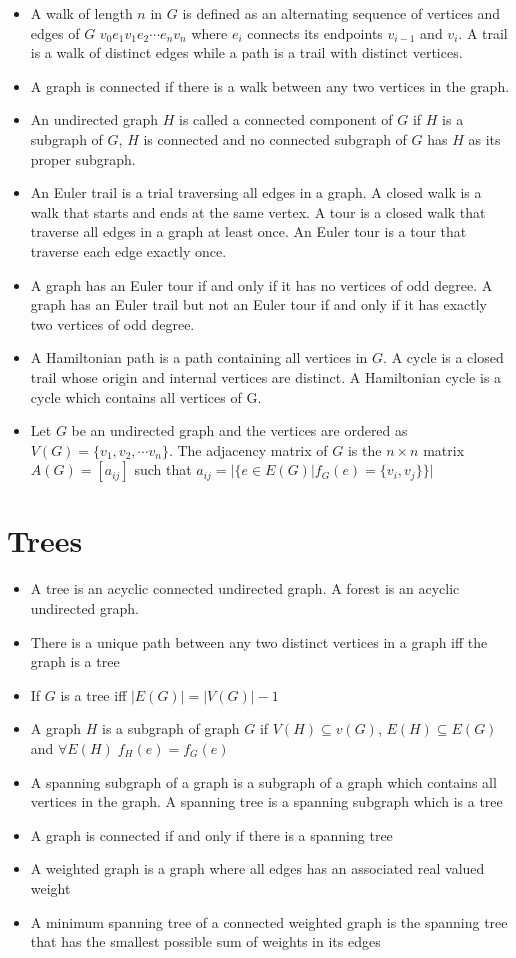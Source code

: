\documentclass[11pt, twocolumn]{article}
\newenvironment{compactitem}
{\begin{itemize}
  \setlength{\itemsep}{1px}
  \setlength{\parskip}{0pt}
  \setlength{\parsep}{0pt}}
{\end{itemize}}
\begin{document}
\begin{compactitem}
\item A walk of length $n$ in $G$ is defined as an alternating sequence of vertices and edges of $G$ $v_0e_1v_1e_2\cdots e_n v_n$ where $e_i$ connects its endpoints $v_{i-1}$ and $v_{i}$. A trail is a walk of distinct edges while a path is a trail with distinct vertices.
\item A graph is connected if there is a walk between any two vertices in the graph.
\item An undirected graph $H$ is called a connected component of $G$ if $H$ is a subgraph of $G$, $H$ is connected and no connected subgraph of $G$ has $H$ as its proper subgraph.
\item An Euler trail is a trial traversing all edges in a graph. A closed walk is a walk that starts and ends at the same vertex. A tour is a closed walk that traverse all edges in a graph at least once. An Euler tour is a tour that traverse each edge exactly once.
\item A graph has an Euler tour if and only if it has no vertices of odd degree. A graph has an Euler trail but not an Euler tour if and only if it has exactly two vertices of odd degree.
\item A Hamiltonian path is a path containing all vertices in $G$. A cycle is a closed trail whose origin and internal vertices are distinct. A Hamiltonian cycle is a cycle which contains all vertices of G.
\item Let $G$ be an undirected graph and the vertices are ordered as $V(G) = \{v_1, v_2, \cdots v_n\}$. The adjacency matrix of $G$ is the $n\times n$ matrix $A(G) = [a_{ij}]$ such that $a_{ij} = |\{e\in E(G) | f_G(e) = \{v_i, v_j\}\}|$
\end{compactitem}
\section{Trees}
\begin{compactitem}
\item A tree is an acyclic connected undirected graph. A forest is an acyclic undirected graph.
\item There is a unique path between any two distinct vertices in a graph iff the graph is a tree
\item If $G$ is a tree iff $|E(G)| = |V(G)|-1$
\item A graph $H$ is a subgraph of graph $G$ if $V(H)\subseteq v(G)$, $E(H) \subseteq E(G)$ and $\forall E(H)\; f_H(e) = f_G(e)$
\item A spanning subgraph of a graph is a subgraph of a graph which contains all vertices in the graph. A spanning tree is a spanning subgraph which is a tree
\item A graph is connected if and only if there is a spanning tree
\item A weighted graph is a graph where all edges has an associated real valued weight
\item A minimum spanning tree of a connected weighted graph is the spanning tree that has the smallest possible sum of weights in its edges
\end{compactitem}
\end{document}
